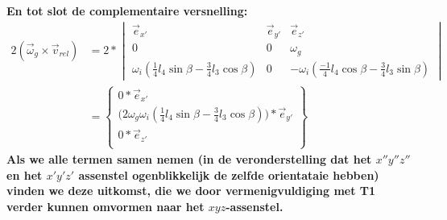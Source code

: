 \documentclass[a4paper,10pt]{article}
\begin{document}
\textbf{En tot slot de complementaire versnelling:}
\begin{equation}
\begin{aligned}
2(\vec{\omega}_g \times \vec{v}_{rel}) &= 2 * \begin{vmatrix}
\vec{e}_{x'} & \vec{e}_{y'} & \vec{e}_{z'}\\
0 & 0 & \omega_g \\
\omega_i  (\frac{1}{4}l_4 \sin{\beta}-\frac{3}{4}l_3  \cos{\beta}) & 0 & -\omega_i (\frac{-1}{4}l_4\cos{\beta} - \frac{3}{4}l_3  \sin{\beta})
\end{vmatrix}\\
&= \begin{Bmatrix}
0 * \vec{e}_{x'}\\
\Big(2\omega_g\omega_i(\frac{1}{4}l_4 \sin{\beta}-\frac{3}{4}l_3  \cos{\beta})\Big)*\vec{e}_{y'}\\
0 * \vec{e}_{z'}\\
\end{Bmatrix}
\end{aligned}
\end{equation}
\textbf{Als we alle termen samen nemen (in de veronderstelling dat het $x''y''z''$ en het $x'y'z'$ assenstel ogenblikkelijk de zelfde orientataie hebben) vinden we deze uitkomst, die we door vermenigvuldiging met T1 verder kunnen omvormen naar het $xyz$-assenstel.}
\end{document}
